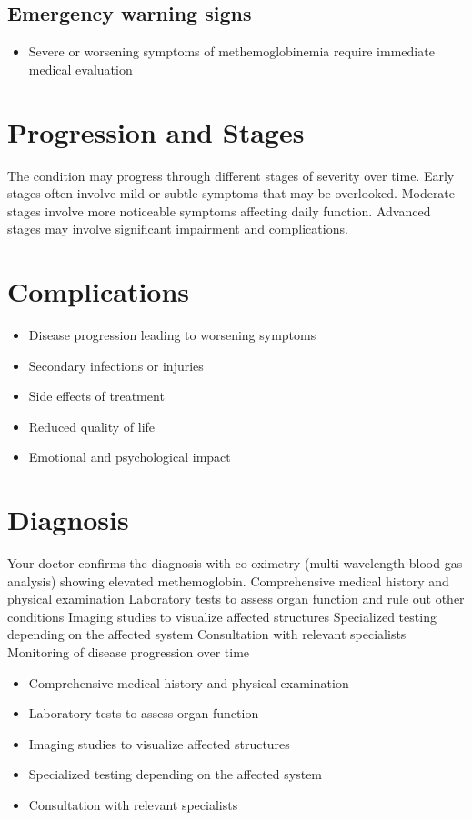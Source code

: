 \subsection{Emergency warning signs}
\begin{itemize}[noitemsep]
  \item Severe or worsening symptoms of methemoglobinemia require immediate medical evaluation
\end{itemize}
\section{Progression and Stages}
The condition may progress through different stages of severity over time. Early stages often involve mild or subtle symptoms that may be overlooked. Moderate stages involve more noticeable symptoms affecting daily function. Advanced stages may involve significant impairment and complications.
\section{Complications}
\begin{itemize}[noitemsep]
  \item Disease progression leading to worsening symptoms
  \item Secondary infections or injuries
  \item Side effects of treatment
  \item Reduced quality of life
  \item Emotional and psychological impact
\end{itemize}
\section{Diagnosis}
Your doctor confirms the diagnosis with co-oximetry (multi-wavelength blood gas analysis) showing elevated methemoglobin. Comprehensive medical history and physical examination Laboratory tests to assess organ function and rule out other conditions Imaging studies to visualize affected structures Specialized testing depending on the affected system Consultation with relevant specialists Monitoring of disease progression over time

\begin{itemize}[noitemsep]
  \item Comprehensive medical history and physical examination
  \item Laboratory tests to assess organ function
  \item Imaging studies to visualize affected structures
  \item Specialized testing depending on the affected system
  \item Consultation with relevant specialists
\end{itemize}
